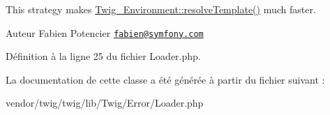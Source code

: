 This strategy makes \hyperlink{class_twig___environment_af1cc34fcbd8561be8a6075517d107630}{Twig\+\_\+\+Environment\+::resolve\+Template()} much faster.

\begin{DoxyAuthor}{Auteur}
Fabien Potencier \href{mailto:fabien@symfony.com}{\tt fabien@symfony.\+com} 
\end{DoxyAuthor}


Définition à la ligne 25 du fichier Loader.\+php.



La documentation de cette classe a été générée à partir du fichier suivant \+:\begin{DoxyCompactItemize}
\item 
vendor/twig/twig/lib/\+Twig/\+Error/Loader.\+php\end{DoxyCompactItemize}
